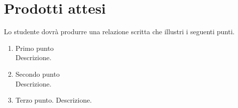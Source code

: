 \section*{Prodotti attesi}
Lo studente dovrà produrre una relazione scritta che illustri i seguenti punti.
\begin{enumerate}
\item Primo punto \\
  Descrizione. 
  
\item Secondo punto \\
  Descrizione.
  
\item Terzo punto.
  Descrizione.
\end{enumerate}
